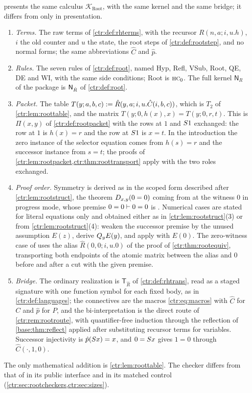 \begin{remark}\label{ctr:rem:rootraw}
 presents the same calculus $\mathcal K_{\mathrm{Root}}$, with the
same kernel and the same bridge; it differs from  only in presentation.
\begin{enumerate}
\item \emph{Terms.} The raw terms of \cref{ctr:def:rhterms}, with the recursor
$R(n,a;i,u.h)$, $i$ the old counter and $u$ the state, the root steps of
\cref{ctr:def:rootstep}, and no normal forms; the same abbreviations $\hat C$ and $\hat p$.
\item \emph{Rules.} The seven rules of \cref{ctr:def:root}, named Hyp, Refl, VSub, Root, QE,
DE and WI, with the same side conditions; Root is $\rulename{HC}_0$. The full kernel
$\mathsf N_R$ of the package is $\mathsf{N}_{\hat R}$ of \cref{ctr:def:root}.
\item \emph{Packet.} The table $T(y;a,b,c)\mathrel{:=}\hat R(y,a;i,u.\hat C(i,b,c))$, which is
$T_2$ of \cref{ctr:lem:roottable}, and the matrix
$T(y;0,h(x),x)=T(y;0,r,t)$. This is $\Pi(x,y)$ of \cref{ctr:def:rootpacket} with the rows at $1$
and $S 1$ exchanged: the row at $1$ is $h(x)=r$ and the row at $S 1$ is $x=t$. In the
introduction the zero instance of the selector equation comes from $h(s)=r$ and the successor
instance from $s=t$; the proofs of \cref{ctr:lem:rootpacket,ctr:thm:roottransport} apply with
the two roles exchanged.
\item \emph{Proof order.} Symmetry is derived as in the scoped form described after
\cref{ctr:lem:rootstruct}, the theorem $D_{x,y}(0=0)$ coming from  at the witness
$0$ in progress mode, whose premise $0=0\vdash 0=0$ is . Numerical cases are
stated for literal equations only and obtained either as in \cref{ctr:lem:rootstruct}(3) or
from \cref{ctr:lem:rootstruct}(4): weaken the successor premise by the unused assumption
$E(z)$, derive $Q_{y}E(y)$, and apply  with $E(0)$. The zero-witness case of
 uses the alias $\hat R(0,0;i,u.0)$ of the proof of \cref{ctr:thm:rootequiv},
transporting both endpoints of the atomic matrix between the alias and $0$ before and after a
cut with the given premise.
\item \emph{Bridge.} The ordinary realization is $\mathsf T_{\hat R}$ of \cref{ctr:def:rhtrans},
read as a staged signature with one function symbol for each fixed body, as in
\cref{ctr:def:languages}; the connectives are the macros \eqref{ctr:eq:macros} with $\hat C$
for $C$ and $\hat p$ for $P$, and the bi-interpretation is the direct route of
\cref{ctr:rem:rootroute}, with quantifier-free induction through the reflection of
\cref{base:thm:reflect} applied after substituting recursor terms for variables. Successor
injectivity is $\hat p(S x)=x$, and $0=S x$ gives $1=0$ through
$\hat C(\cdot,1,0)$.
\end{enumerate}
The only mathematical addition is \cref{ctr:lem:roottable}. The checker differs from that of
 in its public interface and in its matched control
(\cref{ctr:sec:rootcheckers,ctr:sec:sizes}).
\end{remark}


